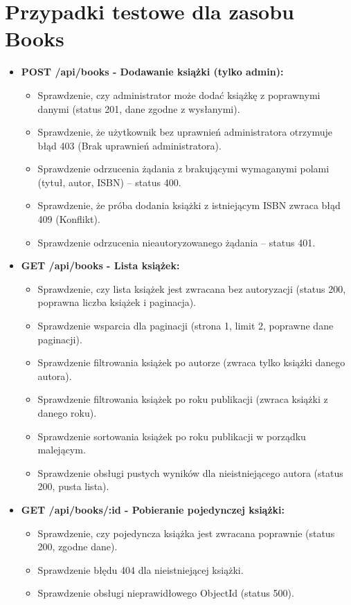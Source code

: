\documentclass{article}
\begin{document}
\section{Przypadki testowe dla zasobu Books}

\begin{itemize}
    \item \textbf{POST /api/books - Dodawanie książki (tylko admin):}
    \begin{itemize}
        \item Sprawdzenie, czy administrator może dodać książkę z poprawnymi danymi (status 201, dane zgodne z wysłanymi).
        \item Sprawdzenie, że użytkownik bez uprawnień administratora otrzymuje błąd 403 (Brak uprawnień administratora).
        \item Sprawdzenie odrzucenia żądania z brakującymi wymaganymi polami (tytuł, autor, ISBN) – status 400.
        \item Sprawdzenie, że próba dodania książki z istniejącym ISBN zwraca błąd 409 (Konflikt).
        \item Sprawdzenie odrzucenia nieautoryzowanego żądania – status 401.
    \end{itemize}

    \item \textbf{GET /api/books - Lista książek:}
    \begin{itemize}
        \item Sprawdzenie, czy lista książek jest zwracana bez autoryzacji (status 200, poprawna liczba książek i paginacja).
        \item Sprawdzenie wsparcia dla paginacji (strona 1, limit 2, poprawne dane paginacji).
        \item Sprawdzenie filtrowania książek po autorze (zwraca tylko książki danego autora).
        \item Sprawdzenie filtrowania książek po roku publikacji (zwraca książki z danego roku).
        \item Sprawdzenie sortowania książek po roku publikacji w porządku malejącym.
        \item Sprawdzenie obsługi pustych wyników dla nieistniejącego autora (status 200, pusta lista).
    \end{itemize}

    \item \textbf{GET /api/books/:id - Pobieranie pojedynczej książki:}
    \begin{itemize}
        \item Sprawdzenie, czy pojedyncza książka jest zwracana poprawnie (status 200, zgodne dane).
        \item Sprawdzenie błędu 404 dla nieistniejącej książki.
        \item Sprawdzenie obsługi nieprawidłowego ObjectId (status 500).
    \end{itemize}


\end{itemize}
\end{document}
